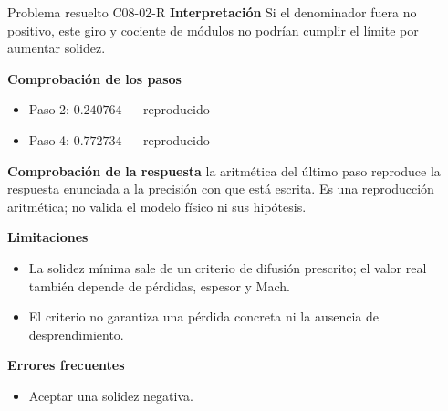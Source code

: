 \documentclass[10pt,openany]{book}
\begin{document}
\begin{studiumworked}{Problema resuelto C08-02-R}
\noindent\textbf{Interpretación}
Si el denominador fuera no positivo, este giro y cociente de módulos no podrían cumplir el límite por aumentar solidez.

\noindent\textbf{Comprobación de los pasos}
\begin{itemize}
\item Paso 2: $0.240764$ — reproducido
\item Paso 4: $0.772734$ — reproducido
\end{itemize}

\noindent\textbf{Comprobación de la respuesta} la aritmética del último paso reproduce la respuesta enunciada a la precisión con que está escrita. Es una reproducción aritmética; no valida el modelo físico ni sus hipótesis.

\noindent\textbf{Limitaciones}
\begin{itemize}
\item La solidez mínima sale de un criterio de difusión prescrito; el valor real también depende de pérdidas, espesor y Mach.
\item El criterio no garantiza una pérdida concreta ni la ausencia de desprendimiento.
\end{itemize}

\noindent\textbf{Errores frecuentes}
\begin{itemize}
\item Aceptar una solidez negativa.
\end{itemize}
\end{studiumworked}
\end{document}
